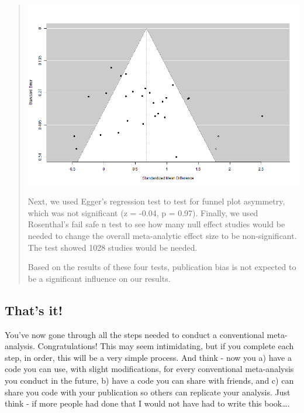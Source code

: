 \documentclass[
]{book}
\begin{document}
\begin{quote}
\includegraphics[width=1\textwidth,height=\textheight]{images/clipboard-2269174522.png}

Next, we used Egger's regression test to test for funnel plot asymmetry, which was not significant (z = -0.04, p = 0.97). Finally, we used Rosenthal's fail safe n test to see how many null effect studies would be needed to change the overall meta-analytic effect size to be non-significant. The test showed 1028 studies would be needed.

Based on the results of these four tests, publication bias is not expected to be a significant influence on our results.
\end{quote}

\hypertarget{thats-it}{%
\subsection{That's it!}\label{thats-it}}

You've now gone through all the steps needed to conduct a conventional meta-analysis. Congratulations! This may seem intimidating, but if you complete each step, in order, this will be a very simple process. And think - now you a) have a code you can use, with slight modifications, for every conventional meta-analysis you conduct in the future, b) have a code you can share with friends, and c) can share you code with your publication so others can replicate your analysis. Just think - if more people had done that I would not have had to write this book\ldots.

\hypertarget{section}{%
\subsubsection{}\label{section}}
\end{document}
